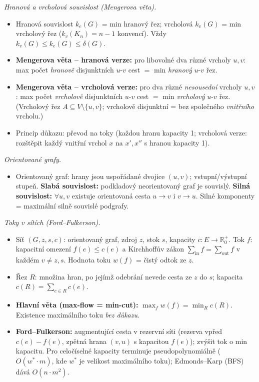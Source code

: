 \documentclass[11pt,a4paper]{article}
\begin{document}
\begin{poznamka}
\smallskip
\emph{Hranová a vrcholová souvislost (Mengerova věta).}
\begin{itemize}
  \item Hranová souvislost $k_e(G)$ = min hranový řez; vrcholová $k_v(G)$ = min vrcholový řez ($k_v(K_n)=n-1$ konvencí). Vždy $k_v(G)\le k_e(G)\le\delta(G)$.
  \item \textbf{Mengerova věta -- hranová verze:} pro libovolné dva různé vrcholy $u,v$: max počet \emph{hranově} disjunktních $u$-$v$ cest $=$ min \emph{hranový} $u$-$v$ řez.
  \item \textbf{Mengerova věta -- vrcholová verze:} pro dva různé \emph{nesousední} vrcholy $u,v$: max počet \emph{vrcholově} disjunktních $u$-$v$ cest $=$ min \emph{vrcholový} $u$-$v$ řez. (Vrcholový řez $A\subseteq V\setminus\{u,v\}$; vrcholově disjunktní = bez společného \emph{vnitřního} vrcholu.)
  \item Princip důkazu: převod na toky (každou hranu kapacity 1; vrcholová verze: rozštěpit každý vnitřní vrchol $x$ na $x',x''$ s hranou kapacity 1).
\end{itemize}

\smallskip
\emph{Orientované grafy.}
\begin{itemize}
  \item Orientovaný graf: hrany jsou uspořádané dvojice $(u,v)$; vstupní/výstupní stupeň. \textbf{Slabá souvislost:} podkladový neorientovaný graf je souvislý. \textbf{Silná souvislost:} $\forall u,v$ existuje orientovaná cesta $u\to v$ i $v\to u$. Silné komponenty = maximální silně souvislé podgrafy.
\end{itemize}

\smallskip
\emph{Toky v sítích (Ford--Fulkerson).}
\begin{itemize}
  \item Síť $(G,z,s,c)$: orientovaný graf, zdroj $z$, stok $s$, kapacity $c\colon E\to\mathbb{R}_0^+$. Tok $f$: kapacitní omezení $f(e)\le c(e)$ a Kirchhoffův zákon $\sum_{\text{in}}f=\sum_{\text{out}}f$ v každém $v\ne z,s$. Hodnota toku $w(f)$ = čistý odtok ze $z$.
  \item Řez $R$: množina hran, po jejímž odebrání nevede cesta ze $z$ do $s$; kapacita $c(R)=\sum_{e\in R}c(e)$.
  \item \textbf{Hlavní věta (max-flow = min-cut):} $\max_f w(f)=\min_R c(R)$. Existence maximálního toku \emph{bez důkazu}.
  \item \textbf{Ford--Fulkerson:} augmentující cesta v rezervní síti (rezerva vpřed $c(e)-f(e)$, zpětná hrana $(v,u)$ s kapacitou $f(e)$); zvýšit tok o min kapacitu. Pro celočíselné kapacity terminuje pseudopolynomiálně ($O(w^*\cdot m)$, kde $w^*$ je velikost maximálního toku); Edmonds--Karp (BFS) dává $O(n\cdot m^2)$.
\end{itemize}
\end{poznamka}
\end{document}
